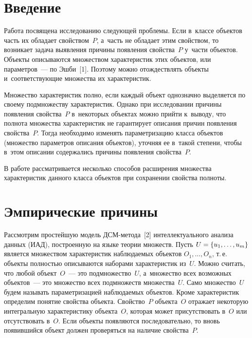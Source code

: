
  



\thispagestyle{headings}

\begin{multicols}{2}

\label{st\stat}
  
\section{Введение}
  
  Работа посвящена исследованию следующей проблемы. Если в~классе объектов 
часть их обладает свойством~$P$, а~часть не обладает этим свойством, то 
возникает задача выявления причины появления свойства~$P$ у~части объектов. 
Объекты описываются множеством характеристик этих объектов, или 
параметров~--- по Эшби~[1]. Поэтому можно отож\-де\-ст\-влять объекты 
и~соответствующие множества их характеристик.
  
  Множество характеристик полно, если каждый объект однозначно выделяется 
по своему подмножеству характеристик. Однако при исследовании причины 
появления свойства~$P$ в~некоторых объектах можно прийти к~выводу, что 
полнота множества характеристик не гарантирует описания причин появления 
свойства~$P$. Тогда необходимо изменять параметризацию класса объектов 
(множество параметров описания объектов), уточняя ее в~такой степени, чтобы 
в~этом описании содержались причины появления свойства~$P$.
  
  В работе рассматривается несколько способов расширения множества 
характеристик данного класса объектов при сохранении свойства 
полноты.
  
\section{Эмпирические причины}

\vspace*{-12pt}
  
  Рассмотрим простейшую модель ДСМ-ме\-то\-да~[2] интеллектуального 
анализа данных (ИАД), построенную на языке теории множеств. Пусть $U\hm= 
\{u_1, \ldots , u_m\}$ является множеством ха\-рак\-те\-ристик наблюдаемых объектов 
$O_1,\ldots , O_n$, т.\,е.\linebreak
 объекты полностью описываются наборами 
характеристик из~$U$. Можно считать, что любой объект~$O$~--- это 
подмножество~$U$, а~множество всех возможных объектов~--- это множество 
всех подмножеств множества~$U$. Само множество~$U$ будем называть 
параметризацией наблюдаемых объектов. Кроме характеристик определим 
понятие свойства объекта. Свойство~$P$ объекта~$O$ отражает некоторую 
интегральную характеристику объекта~$O$, которая может присутствовать в~$O$ 
или отсутствовать в~$O$. Если объекты появляются последовательно, то вновь 
появившийся объект должен проверяться на наличие свойства~$P$.
  

\end{multicols}
